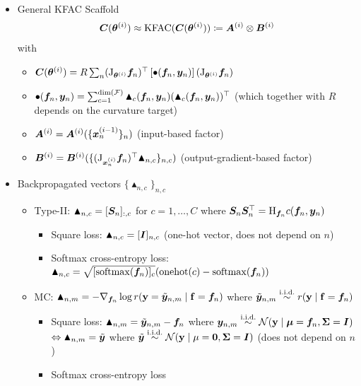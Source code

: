 \begin{itemize}
  \item General KFAC Scaffold
  \begin{align*}
    {\bm{C}}({\bm{\theta}}^{(i)})
    \approx
    \mathrm{KFAC}({\bm{C}}({\bm{\theta}}^{(i)}))
    \coloneqq {\bm{A}}^{(i)} \otimes {\bm{B}}^{(i)}
  \end{align*}
  with
  \begin{itemize}
    \item ${\bm{C}}({\bm{\theta}}^{(i)})
    = R \sum_n
    (\mathrm{J}_{{\bm{\theta}}^{(i)}} {\bm{f}}_n)^{\top}
    \left[ \bullet({\bm{f}}_n, {\bm{y}}_n) \right]
    (\mathrm{J}_{{\bm{\theta}}^{(i)}} {\bm{f}}_n)$
    \item $\bullet({\bm{f}}_n, {\bm{y}}_n) = \sum_{c=1}^{\dim({\mathcal{F}})} \blacktriangle_c({\bm{f}}_n, {\bm{y}}_n) (\blacktriangle_c({\bm{f}}_n, {\bm{y}}_n))^{\top}$ \quad (which together with $R$ depends on the curvature target)
    \item ${\bm{A}}^{(i)} = {\bm{A}}^{(i)}( \{{\bm{x}}_{n}^{(i-1)}\}_n )$ \quad (input-based factor)
    \item ${\bm{B}}^{(i)} = {\bm{B}}^{(i)}( \{ (\mathrm{J}_{{\bm{x}}_n^{(i)}}{\bm{f}}_{n})^{\top} \blacktriangle_{n,c}\}_{n,c})$ \quad (output-gradient-based factor)
  \end{itemize}
  \item Backpropagated vectors $\{ \blacktriangle_{n,c} \}_{n,c}$
    \begin{itemize}
    \item Type-II: $\blacktriangle_{n,c} = [{\bm{S}}_n]_{:,c}$ for $c = 1, \dots, C$ where ${\bm{S}}_n {\bm{S}}_n^{\top} = \mathrm{H}_{{\bm{f}}_n} c({\bm{f}}_n, {\bm{y}}_n)$
      \begin{itemize}
      \item Square loss: $\blacktriangle_{n,c} = [{\bm{I}}]_{n,c}$  (one-hot vector, does not depend on $n$)
      \item Softmax cross-entropy loss: $\blacktriangle_{n,c} =  \sqrt{[\mathrm{softmax}({\bm{f}}_n)]_c} (\mathrm{onehot}(c) - \mathrm{softmax}({\bm{f}}_n))$
      \end{itemize}

    \item MC: $\blacktriangle_{n,m} = - \nabla_{{\bm{f}}_n} \log r({\mathbf{y}} = \tilde{{\bm{y}}}_{n,m} \mid {\mathbf{f}} = {\bm{f}}_n)$ where $\tilde{\vy}_{n,m} \stackrel{\text{\iid}}{\sim} r(\rvy \mid \rvf = \vf_n)$
      \begin{itemize}
      \item Square loss: $\blacktriangle_{n,m} = \tilde{{\bm{y}}}_{n,m} - {\bm{f}}_n$ where $\vy_{n,m} \stackrel{\text{\iid}}{\sim} \gN(\rvy \mid \vmu = \vf_n, \mSigma = \mI)$\\
        $\Leftrightarrow \blacktriangle_{n,m} = \tilde{{\bm{y}}}$ where $\tilde{\vy} \stackrel{\text{\iid}}{\sim} \gN(\rvy \mid \mu = \vzero, \mSigma = \mI)$ (does not depend on $n$)
        \item Softmax cross-entropy loss
      \end{itemize}


\end{itemize}
\end{itemize}

